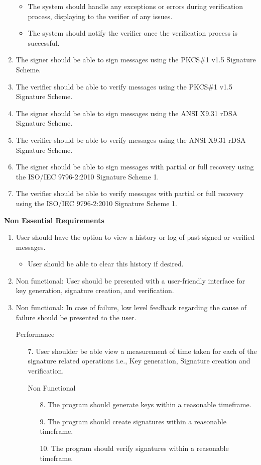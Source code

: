 \documentclass[]{final_report}
\theoremstyle{definition}
\begin{document}
\begin{enumerate}
\begin{itemize}
\item The system should handle any exceptions or errors during verification process, displaying to the verifier of any issues.
\item The system should notify the verifier once the verification process is successful.
\end{itemize}
\item The signer should be able to sign messages using the PKCS\#1 v1.5 Signature Scheme.
\item The verifier should be able to verify messages using the PKCS\#1 v1.5 Signature Scheme.
\item The signer should be able to sign messages using the ANSI X9.31 rDSA Signature Scheme.
\item The verifier should be able to verify messages using the ANSI X9.31 rDSA Signature Scheme.
\item The signer should be able to sign messages with partial or full recovery using the ISO/IEC 9796-2:2010 Signature Scheme 1.
\item The verifier should be able to verify messages with partial or full recovery using the ISO/IEC 9796-2:2010 Signature Scheme 1.
\end{enumerate}

\textbf{Non Essential Requirements}
\begin{enumerate}
\item User should have the option to view a history or log of past signed or verified messages.
\begin{itemize}
\item User should be able to clear this history if desired.
\end{itemize}
\item Non functional: User should be presented with a user-friendly interface for key generation, signature creation, and verification.
\item Non functional: In case of failure, low level feedback regarding the cause of failure should be presented to the user.

\item[] Performance
\begin{enumerate}
\item[7.] User shoulder be able view a measurement of time taken for each of the signature related operations i.e., Key generation, Signature creation and verification.
\item[] Non Functional
\begin{itemize}
\item[8.] The program should generate keys within a reasonable timeframe.
\item[9.] The program should create signatures within a reasonable timeframe.
\item[10.] The program should verify signatures within a reasonable timeframe.
\end{itemize}
\end{enumerate}
\end{enumerate}
\end{document}
